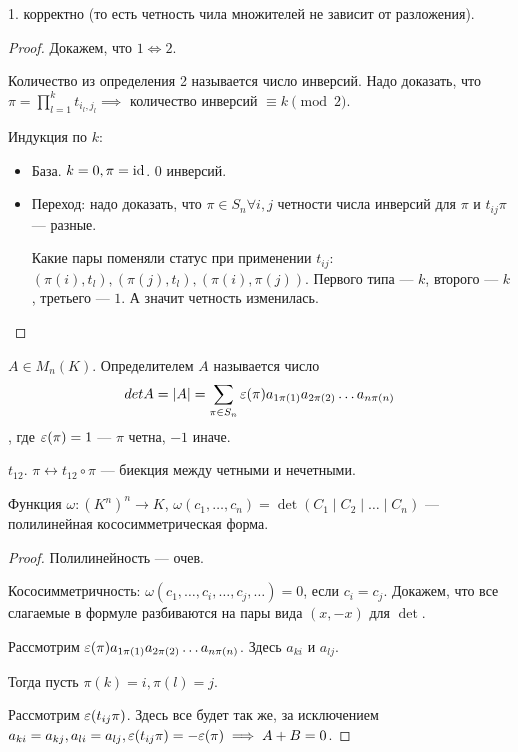 \begin{consequence}
    1. корректно (то есть четность чила множителей не зависит от разложения).
\end{consequence}
\begin{proof}
    Докажем, что $1 \iff 2$.

    Количество из определения 2 называется число инверсий. Надо доказать, что $\pi = \prod\limits_{l = 1}^k t_{i_l, j_l} \implies$ количество инверсий $\equiv k \pmod 2$. 

     Индукция по $k$:
      \begin{itemize}
          \item База. $k = 0, \pi = \operatorname{id}$. 0 инверсий.
          \item Переход: надо доказать, что  $\pi \in S_n \forall i, j$ четности числа инверсий для  $\pi$ и  $t_{ij} \pi$ --- разные.
            
              Какие пары поменяли статус при применении $t_{ij}$:  $(\pi(i), t_l), (\pi(j), t_l), (\pi(i), \pi(j))$. Первого типа --- $k$, второго --- $k$, третьего ---  $1$. А значит четность изменилась.
      \end{itemize}
\end{proof}
\begin{definition}
    $A \in M_n(K)$. Определителем  $A$ называется число  \[det A = |A| = \sum\limits_{\pi \in S_n} \varepsilon(\pi) a_{1\pi(1)}a_{2\pi(2)}\ldots a_{n \pi(n)}\], где $\varepsilon(\pi) = 1$ --- $\pi$ четна,  $-1$ иначе. 
\end{definition}
\begin{remark}
    $t_{12}$.  $\pi \leftrightarrow t_{12} \circ \pi$ --- биекция между четными и нечетными.
\end{remark}
\begin{statement}
    Функция $\omega\!: (K^n)^n \to K$, $\omega(c_1, \ldots, c_n) = \det(C_1 \mid C_2 \mid\ldots\mid C_n)$ --- полилинейная кососимметрическая форма.
\end{statement}
\begin{proof}
    Полилинейность --- очев. 

    Кососимметричность: $\omega(c_1, \ldots, c_i, \ldots,c_j, \ldots) = 0$, если $c_i = c_j$. Докажем, что все слагаемые в формуле разбиваются на пары вида  $(x, -x)$ для  $\det$.

    Рассмотрим $\varepsilon(\pi) a_{1\pi(1)} a_{2\pi(2)}\ldots a_{n\pi(n)}$. Здесь $a_{ki}$ и  $a_{lj}$.

    Тогда пусть $\pi(k) = i, \pi(l) = j$.

    Рассмотрим  $\varepsilon(t_{ij}\pi)$. Здесь все будет так же, за исключением $a_{ki} = a_{kj}, a_{li} = a_{lj}, \varepsilon(t_{ij}\pi) = -\varepsilon(\pi) \implies A+B=0$.
\end{proof}
